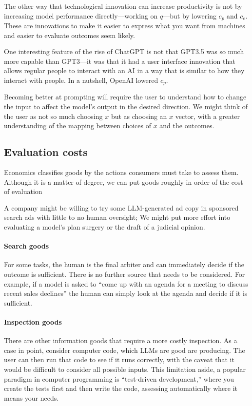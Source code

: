 \documentclass{article}
\begin{document}
The other way that technological innovation can increase productivity is not by increasing model performance directly---working on $q$---but by lowering $c_p$ and $c_e$. 
These are innovations to make it easier to express what you want from machines and easier to evaluate outcomes seem likely. 

One interesting feature of the rise of ChatGPT is not that GPT3.5 was so much more capable than GPT3---it was that it had a user interface innovation that allows regular people to interact with an AI in a way that is similar to how they interact with people.
In a nutshell, OpenAI lowered $c_p$.

Becoming better at prompting will require the user to understand how to change the input to affect the model's output in the desired direction. 
We might think of the user as not so much choosing $x$ but as choosing an $x$ vector, with a greater understanding of the mapping between choices of $x$ and the outcomes.

\subsection{Evaluation costs}
Economics classifies goods by the actions consumers must take to assess them. 
Although it is a matter of degree, we can put goods roughly in order of the cost of evaluation

A company might be willing to try some LLM-generated ad copy in sponsored search ads with little to no human oversight; 
We might put more effort into evaluating a model's plan surgery or the draft of a judicial opinion.

\paragraph{Search goods}
For some tasks, the human is the final arbiter and can immediately decide if the outcome is sufficient.
There is no further source that needs to be considered.
For example, if a model is asked to ``come up with an agenda for a meeting to discuss recent sales declines'' the human can simply look at the agenda and decide if it is sufficient. 

\paragraph{Inspection goods}
There are other information goods that require a more costly inspection. 
As a case in point, consider computer code, which LLMs are good are producing. 
The user can then run that code to see if it runs correctly, with the caveat that it would be difficult to consider all possible inputs. 
This limitation aside, a popular paradigm in computer programming is ``test-driven development,'' where you create the tests first and then write the code, assessing automatically where it means your needs.
\end{document}
